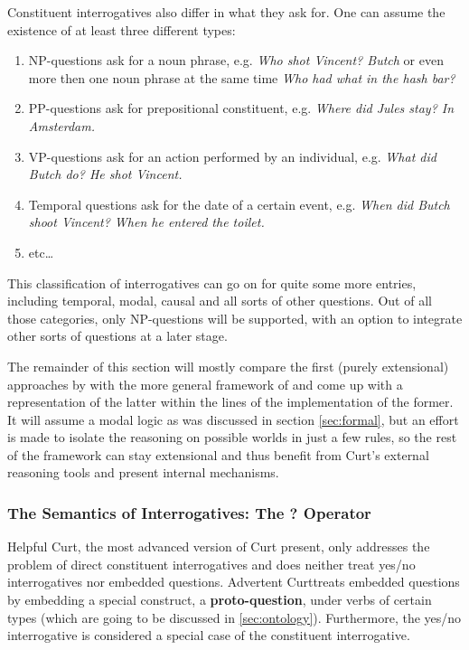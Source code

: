\documentclass[11pt,a4paper]{article}
\newcommand{\term}[1]{\textsf{\textbf{#1}}} %
\newcommand{\pn}{\textsf} %
\newcommand{\example}{\textit} %
\newcommand{\curt}{\pn{Curt}}
\newcommand{\acurt}{\pn{Advertent Curt}}
\theoremstyle{remark}
\theoremstyle{remark}
\theoremstyle{definition}
\begin{document}
Constituent interrogatives also differ in what they ask for. One can assume the existence of at
least three different types:

\begin{enumerate}
  \item NP-questions ask for a noun phrase, e.g. \example{Who shot Vincent?
  Butch} or even more then one noun phrase at the same time \example{Who had
  what in the hash bar?}
  \item PP-questions ask for prepositional constituent, e.g. \example{Where did
  Jules stay? In Amsterdam.}
  \item VP-questions ask for an action performed by an individual, e.g.
  \example{What did Butch do? He shot Vincent.}
  \item Temporal questions ask for the date of a certain event, e.g.
  \example{When did Butch shoot Vincent? When he entered the toilet.}
  \item etc\ldots
\end{enumerate}

This classification of interrogatives can go on for quite some more entries,
including temporal, modal, causal and all sorts of other questions. Out of all
those categories, only NP-questions will be supported, with an option to
integrate other sorts of questions at a later stage.

The remainder of this section will mostly compare the first (purely extensional)
approaches by \cite{blackburnbos:cl1} with the more general framework of
\cite{gs:q} and come up with a representation of the latter within the lines of
the implementation of the former. It will assume a modal logic as was discussed
in section \ref{sec:formal}, but an effort is made to isolate the reasoning on
possible worlds in just a few rules, so the rest of the framework can stay
extensional and thus benefit from \curt's external reasoning tools and present
internal mechanisms.

\subsubsection{The Semantics of Interrogatives: The ? Operator}\label{sec:protoq}

\pn{Helpful Curt}, the most advanced version of \curt{} \cite{blackburnbos:cl1}
present, only addresses the problem of direct constituent interrogatives and
does neither treat yes/no interrogatives nor embedded questions. \acurt treats
embedded questions by embedding a special construct, a \term{proto-question},
under verbs of certain types (which are going to be discussed in
\ref{sec:ontology}). Furthermore, the yes/no interrogative is considered a
special case of the constituent interrogative.
\end{document}
